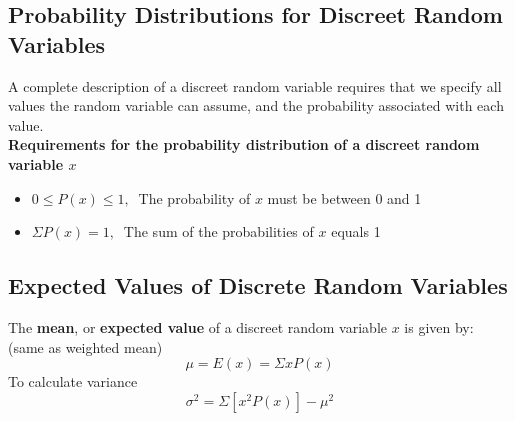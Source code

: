 \documentclass[a4paper]{article}
\let\bf\textbf
\begin{document}
\subsection{Probability Distributions for Discreet Random Variables}
A complete description of a discreet random variable requires that we specify all values the random variable can assume, and the probability associated with each value.
\vspace{3mm}\\
\bf{Requirements for the probability distribution of a discreet random variable $x$}
\begin{itemize}
    \item $0 \leq P(x) \leq 1,\ $ The probability of $x$ must be between 0 and 1
    \item $\Sigma P(x) = 1,\ $ The sum of the probabilities of $x$ equals 1
\end{itemize}
\subsection{Expected Values of Discrete Random Variables}
The \bf{mean}, or \bf{expected value} of a discreet random variable $x$ is given by: \hspace{15mm} (same as weighted mean)
\begin{equation}
    \mu = E(x) = \Sigma x P(x)
\end{equation}
To calculate variance 
\begin{equation}
    \sigma^2 = \Sigma [x^2 P(x)] - \mu^2
\end{equation}
\end{document}
